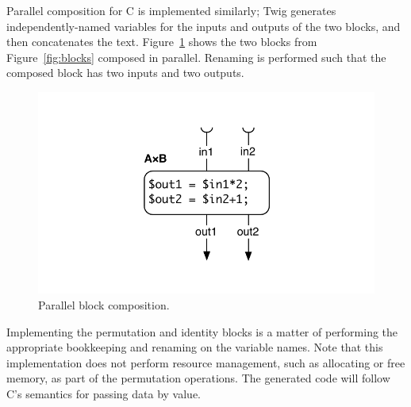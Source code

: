Parallel composition for C is implemented similarly; Twig generates
independently-named variables for the inputs and outputs of the two blocks,
and then concatenates the text. Figure~\ref{fig:codegen-par} shows the two
blocks from Figure~\ref{fig:blocks} composed in parallel. Renaming is
performed such that the composed block has two inputs and two outputs.

\begin{figure}[ht]
\centering
\includegraphics[width=0.75\columnwidth]{images/code-gen3}
\caption{Parallel block composition.}
\label{fig:codegen-par}
\end{figure}

Implementing the permutation and identity blocks is a matter of
performing the appropriate bookkeeping and renaming on the
variable names. Note that this implementation does not perform
resource management, such as allocating or free memory, as part of
the permutation operations. The generated code will follow C's
semantics for passing data by value.
